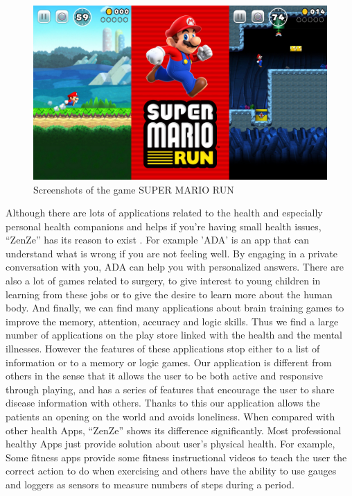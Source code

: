 \documentclass{sigchi}
\begin{document}
\begin{figure}[!ht]
\centering
\includegraphics[scale=0.18]{figures/UIDesign/Superm.jpg}
\caption{Screenshots of the game SUPER MARIO RUN}
\label{fig1}
\end{figure}


Although there are lots of applications related to the health and especially personal health companions and helps if you're having small health issues, ``ZenZe'' has its reason to exist . For example 'ADA' is an app that can understand what is wrong if you are not feeling well. By engaging in a private conversation with you, ADA can help you with personalized answers. There are also a lot of games related to surgery, to give interest to young children in learning from these jobs or to give the desire to learn more about the human body. And finally, we can find many applications about brain training games to improve the memory, attention, accuracy and logic skills. Thus we find a large number of applications on the play store linked with the health and the mental illnesses. However the features of these applications stop either to a list of information or to a memory or logic games. Our application is different from others in the sense that it allows the user to be both active and responsive through playing, and has a series of features that encourage the user to share disease information with others. Thanks to this our application allows the patients an opening on the world and avoids loneliness. When compared with other health Apps, ``ZenZe'' shows its difference significantly. Most professional healthy Apps just provide solution about user's physical health. For example, Some fitness apps provide some fitness instructional videos to teach the user the correct action to do when exercising and others have the ability to use gauges and loggers as sensors to measure numbers of steps during a period.
\end{document}
